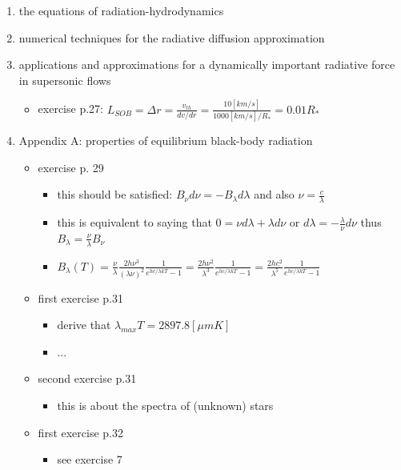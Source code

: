 \documentclass[10pt,a4paper]{article}
\begin{document}
\begin{enumerate}
\begin{itemize}
\end{itemize}



\item the equations of radiation-hydrodynamics
\item numerical techniques for the radiative diffusion approximation

\item applications and approximations for a dynamically important radiative force in supersonic flows
\begin{itemize}
\item exercise p.27: $L_{SOB} = \Delta r = \frac{v_{th}}{dv/dr} = \frac{10 [km/s]}{1000 [km/s]/R_{*}} = 0.01 R_{*}$
\end{itemize}

\item Appendix A: properties of equilibrium black-body radiation
\begin{itemize}

\item exercise p. 29
\begin{itemize}
\item this should be satisfied: $B_{\nu} d\nu = -B_{\lambda} d\lambda$ and also $\nu  = \frac{c}{\lambda}$
\item this is equivalent to saying that $0 = \nu d \lambda + \lambda d \nu$ or $d \lambda = - \frac{\lambda}{\nu} d\nu$ thus $B_{\lambda} = \frac{\nu}{\lambda} B_{\nu}$
\item $B_{\lambda}(T) = \frac{\nu}{\lambda} \frac{2h \nu^3}{(\lambda \nu)^2} \frac{1}{e^{h c/ \lambda kT} - 1} = \frac{2h \nu^2}{\lambda^3} \frac{1}{e^{h c/ \lambda kT} - 1} = \frac{2hc^2}{\lambda^5} \frac{1}{e^{h c/ \lambda kT} - 1}$ 
\end{itemize}

\item first exercise p.31
\begin{itemize}
\item derive that $\lambda_{max} T = 2897.8 [\mu m K]$
\item ...
\end{itemize}

\item second exercise p.31
\begin{itemize}
\item this is about the spectra of (unknown) stars
\end{itemize}

\item first exercise p.32
\begin{itemize}
\item see exercise 7
\end{itemize}


\end{itemize}
\end{enumerate}
\end{document}
